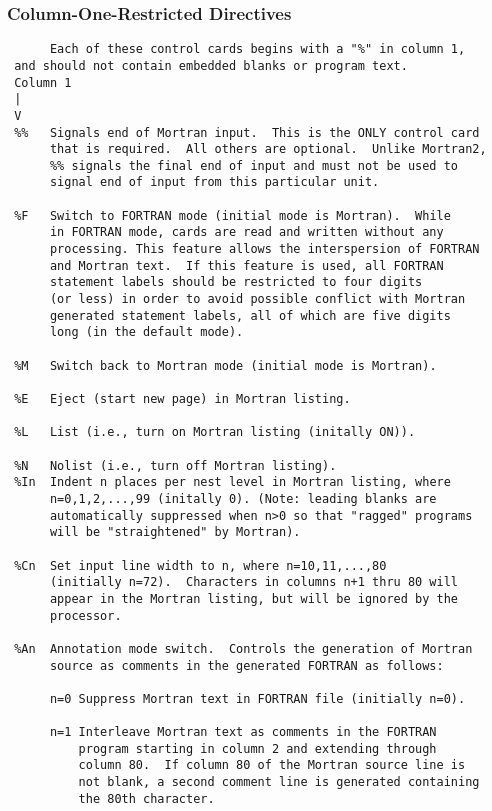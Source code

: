 \subsubsection{Column-One-Restricted Directives}
 \begin{verbatim}
      Each of these control cards begins with a "%" in column 1,
 and should not contain embedded blanks or program text.
 Column 1
 |
 V
 %%   Signals end of Mortran input.  This is the ONLY control card
      that is required.  All others are optional.  Unlike Mortran2,
      %% signals the final end of input and must not be used to
      signal end of input from this particular unit.

 %F   Switch to FORTRAN mode (initial mode is Mortran).  While
      in FORTRAN mode, cards are read and written without any
      processing. This feature allows the interspersion of FORTRAN
      and Mortran text.  If this feature is used, all FORTRAN
      statement labels should be restricted to four digits
      (or less) in order to avoid possible conflict with Mortran
      generated statement labels, all of which are five digits
      long (in the default mode).

 %M   Switch back to Mortran mode (initial mode is Mortran).

 %E   Eject (start new page) in Mortran listing.

 %L   List (i.e., turn on Mortran listing (initally ON)).

 %N   Nolist (i.e., turn off Mortran listing).
 %In  Indent n places per nest level in Mortran listing, where
      n=0,1,2,...,99 (initally 0). (Note: leading blanks are
      automatically suppressed when n>0 so that "ragged" programs
      will be "straightened" by Mortran).

 %Cn  Set input line width to n, where n=10,11,...,80
      (initially n=72).  Characters in columns n+1 thru 80 will
      appear in the Mortran listing, but will be ignored by the
      processor.

 %An  Annotation mode switch.  Controls the generation of Mortran
      source as comments in the generated FORTRAN as follows:

      n=0 Suppress Mortran text in FORTRAN file (initially n=0).

      n=1 Interleave Mortran text as comments in the FORTRAN
          program starting in column 2 and extending through
          column 80.  If column 80 of the Mortran source line is
          not blank, a second comment line is generated containing
          the 80th character.


\end{verbatim}
